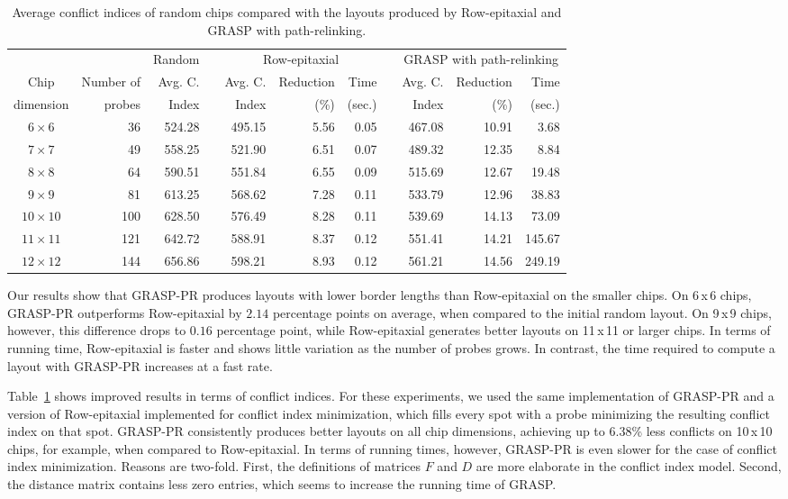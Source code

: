 \documentclass[english]{lni}
\begin{document}
\begin{table}[t]
\caption{Average conflict indices of random chips compared with the layouts produced by
Row-epitaxial and GRASP with path-relinking.\label{tab:graspr_reptx_ci}}
\vspace*{2ex}
\scriptsize{
\begin{tabular}{crrcrrrcrrr}
          &            & Random & & \multicolumn{3}{c}{Row-epitaxial}  & & \multicolumn{3}{c}{GRASP with path-relinking}  \\ \cline{3-3} \cline{5-7} \cline{9-11}
Chip      & Number of  & Avg. C.& & Avg. C.& Reduction & Time          & & Avg. C.& Reduction & Time   \\
dimension & probes     & Index  & & Index  & (\%)      & (sec.)        & & Index  & (\%)      & (sec.) \\
\hline
$6\times 6$   &  36 & 524.28 & & 495.15 & 5.56 & 0.05 & & 467.08 & 10.91 &   3.68 \\
$7\times 7$   &  49 & 558.25 & & 521.90 & 6.51 & 0.07 & & 489.32 & 12.35 &   8.84 \\
$8\times 8$   &  64 & 590.51 & & 551.84 & 6.55 & 0.09 & & 515.69 & 12.67 &  19.48 \\
$9\times 9$   &  81 & 613.25 & & 568.62 & 7.28 & 0.11 & & 533.79 & 12.96 &  38.83 \\
$10\times 10$ & 100 & 628.50 & & 576.49 & 8.28 & 0.11 & & 539.69 & 14.13 &  73.09 \\
$11\times 11$ & 121 & 642.72 & & 588.91 & 8.37 & 0.12 & & 551.41 & 14.21 & 145.67 \\
$12\times 12$ & 144 & 656.86 & & 598.21 & 8.93 & 0.12 & & 561.21 & 14.56 & 249.19 \\
\hline
\end{tabular}}
\end{table}

Our results show that GRASP-PR produces layouts with lower border lengths than
Row-epitaxial on the smaller chips. On 6\,x\,6 chips, GRASP-PR
outperforms Row-epitaxial by $2.14$ percentage points on average, when compared to
the initial random layout. On 9\,x\,9 chips, however, this difference drops to
$0.16$ percentage point, while Row-epitaxial generates better layouts on 11\,x\,11
or larger chips.
In terms of running time, Row-epitaxial is faster and shows little variation
as the number of probes grows. In contrast, the time required to compute a
layout with GRASP-PR increases at a fast rate.

Table~\ref{tab:graspr_reptx_ci} shows improved results in terms of conflict indices.
For these experiments, we used the same implementation of GRASP-PR and a version of
Row-epitaxial implemented for conflict index minimization, which fills every spot
with a probe minimizing the resulting conflict index on that spot. GRASP-PR
consistently produces better layouts on all chip dimensions, achieving up to
$6.38$\% less conflicts on 10\,x\,10 chips, for example, when compared to Row-epitaxial.
In terms of running times, however, GRASP-PR is even slower for the case of conflict
index minimization. Reasons are two-fold. First, the definitions of matrices $F$ and $D$
are more elaborate in the conflict index model. Second, the distance matrix contains
less zero entries, which seems to increase the running time of GRASP.
\end{document}
